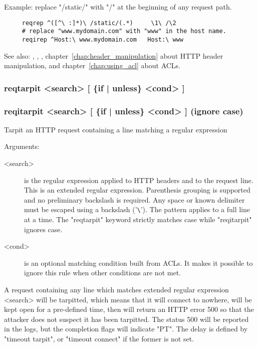 {  Example: replace "/static/" with "/" at the beginning of any request path.
  \begin{verbatim}
     reqrep ^([^\ :]*)\ /static/(.*)     \1\ /\2
     # replace "www.mydomain.com" with "www" in the host name.
     reqirep ^Host:\ www.mydomain.com   Host:\ www
  \end{verbatim}

  See also: , , , chapter~\ref{chap:header_manipulation} about HTTP header
            manipulation, and chapter~\ref{chap:using_acl} about ACLs.

\subsubsection[reqtarpit]{reqtarpit  <search> [ \{if | unless\} <cond> ]}
\subsubsection[reqitarpit]{reqitarpit <search> [ \{if | unless\} <cond> ]  (ignore case)}


  Tarpit an HTTP request containing a line matching a regular expression


  Arguments:
  \begin{description}
  \item[<search>] is the regular expression applied to HTTP headers and to the
              request line. This is an extended regular expression. Parenthesis
              grouping is supported and no preliminary backslash is required.
              Any space or known delimiter must be escaped using a backslash
              ('\verb|\|'). The pattern applies to a full line at a time. The
              "reqtarpit" keyword strictly matches case while "reqitarpit"
              ignores case.

  \item[<cond>] is an optional matching condition built from ACLs. It makes it
              possible to ignore this rule when other conditions are not met.
  \end{description}

  A request containing any line which matches extended regular expression
  <search> will be tarpitted, which means that it will connect to nowhere, will
  be kept open for a pre-defined time, then will return an HTTP error 500 so
  that the attacker does not suspect it has been tarpitted. The status 500 will
  be reported in the logs, but the completion flags will indicate "PT". The
  delay is defined by "timeout tarpit", or "timeout connect" if the former is
  not set.

}
